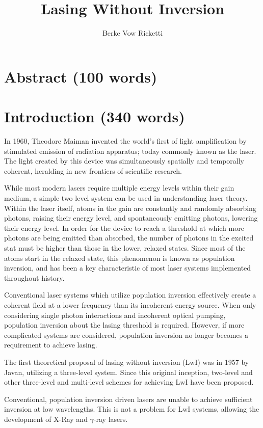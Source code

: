 \documentclass{article}
\title{Lasing Without Inversion}
\author{Berke Vow Ricketti}
\begin{document}
\maketitle{}




\section{Abstract (100 words)}

\section{Introduction (340 words)}

In 1960, Theodore Maiman invented the world's first of light amplification by stimulated emission of radiation apparatus; today commonly known as the laser. The light created by this device was simultaneously spatially and temporally coherent, heralding in new frontiers of scientific research. 

While most modern lasers require multiple energy levels within their gain medium, a simple two level system can be used in understanding laser theory. Within the laser itself, atoms in the gain are constantly and randomly absorbing photons, raising their energy level, and spontaneously emitting photons, lowering their energy level. In order for the device to reach a threshold at which more photons are being emitted than absorbed, the number of photons in the excited stat must be higher than those in the lower, relaxed states. Since most of the atoms start in the relaxed state, this phenomenon is known as population inversion, and has been a key characteristic of most laser systems implemented throughout history.

Conventional laser systems which utilize population inversion effectively create a coherent field at a lower frequency than its incoherent energy source. When only considering single photon interactions and incoherent optical pumping, population inversion about the lasing threshold is required. However, if more complicated systems are considered, population inversion no longer becomes a requirement to achieve lasing.

The first theoretical proposal of lasing without inversion (LwI) was in 1957 by Javan, utilizing a three-level system. Since this original inception, two-level and other three-level and multi-level schemes for achieving LwI have been proposed.

Conventional, population inversion driven lasers are unable to achieve sufficient inversion at low wavelengths. This is not a problem for LwI systems, allowing the development of X-Ray and $\gamma$-ray lasers.
\end{document}
